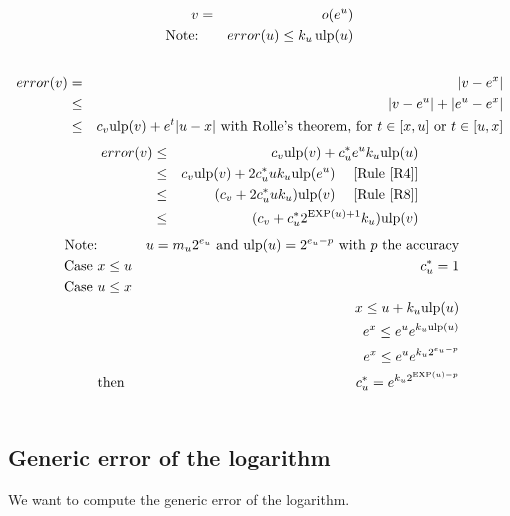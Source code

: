 \documentclass[12pt]{amsart}
\def\n{\textnormal}
\def\ulp{{\rm ulp}}
\def\Exp{{\rm EXP}}
\newcommand{\U}[1]{\quad \mbox{[Rule~\ref{#1}]}}
\begin{document}
\begin{eqnarray}\nonumber
v&=&o(e^{u}) \\\nonumber
\textnormal{Note:}&& error(u) \leq k_u \, \ulp(u)\\\nonumber
\end{eqnarray}
\begin{eqnarray}\nonumber
error(v)& = &|v - e^{x}| \\\nonumber
& \leq &|v - e^{u}| +|e^{u} - e^{x}| \\\nonumber
& \leq & c_v \ulp(v) +  e^t |u-x| \n{ with Rolle's theorem, for } t\in[x,u]\n{ or }t\in[u,x]
\end{eqnarray}
\begin{eqnarray}\nonumber
error(v)& \leq & c_v \ulp(v) +  c_u^* e^u k_u \ulp(u) \\\nonumber
& \leq & c_v \ulp(v) +  2 c_u^* u k_u \ulp(e^u) \;\U{R4}\\\nonumber
& \leq & (c_v +  2 c_u^* u k_u )\ulp(v) \;\U{R8}\\\nonumber
& \leq & (c_v +  c_u^* 2^{\Exp(u)+1} k_u )\ulp(v)
\end{eqnarray}
\begin{eqnarray}\nonumber
\textnormal{Note:}&& u= m_u 2^{e_u} \n{ and }\ulp(u)=2^{e_u-p} \n{ with } p \n{ the accuracy} \\\nonumber
\n{ Case }&x \leq u&  c_u^* =1 \\\nonumber
\n{ Case }&u \leq x& \\\nonumber
&&  x \leq u + k_u \ulp(u)\\\nonumber
&& e^x \leq e^u e^{k_u \ulp(u)}\\\nonumber
&&e^x \leq e^u e^{k_u 2^{e_u-p}}\\\nonumber
&\n{then}& c_u^* = e^{k_u 2^{\Exp(u)-p}}\\\nonumber
\end{eqnarray}



\subsection{Generic error of the logarithm }\label{generic:log}


We want to compute the generic error of the logarithm.
\end{document}
